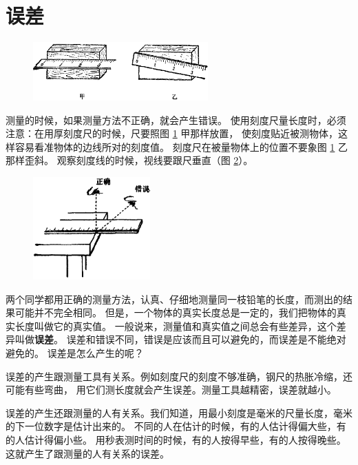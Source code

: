 \section{误差}\label{sec:1-3}

\begin{figure}[htbp]
  \centering
  \includegraphics[width=0.6\textwidth]{../pic/czwl1-ch1-11}
  \caption{}\label{fig:1-11}
\end{figure}

测量的时候，如果测量方法不正确，就会产生错误。
使用刻度尺量长度时，必须注意：在用厚刻度尺的时候，尺要照图 \ref{fig:1-11} 甲那样放置，
使刻度贴近被测物体，这样容易看准物体的边线所对的刻度值。
刻度尺在被量物体上的位置不要象图 \ref{fig:1-11} 乙那样歪斜。
观察刻度线的时候，视线要跟尺垂直（图 \ref{fig:1-12}）。

\begin{figure}[htbp]
  \centering
  \includegraphics[width=0.4\textwidth]{../pic/czwl1-ch1-12}
  \caption{}\label{fig:1-12}
\end{figure}

两个同学都用正确的测量方法，认真、仔细地测量同一枝铅笔的长度，而测出的结果可能并不完全相同。
但是，一个物体的真实长度总是一定的，我们把物体的真实长度叫做它的真实值。
一般说来，测量值和真实值之间总会有些差异，这个差异叫做\textbf{误差}。
误差和错误不同，错误是应该而且可以避免的，而误差是不能绝对避免的。
误差是怎么产生的呢？

误差的产生跟测量工具有关系。例如刻度尺的刻度不够准确，钢尺的热胀冷缩，还可能有些弯曲，
用它们测长度就会产生误差。测量工具越精密，误差就越小。

误差的产生还跟测量的人有关系。我们知道，用最小刻度是毫米的尺量长度，毫米的下一位数字是估计出来的。
不同的人在估计的时候，有的人估计得偏大些，有的人估计得偏小些。
用秒表测时间的时候，有的人按得早些，有的人按得晚些。
这就产生了跟测量的人有关系的误差。

